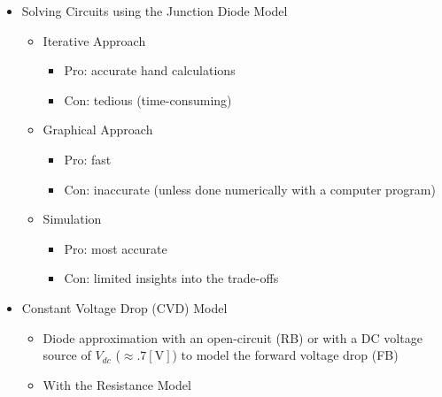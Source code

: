 \begin{itemize}
  \item Solving Circuits using the Junction Diode Model

    \begin{itemize}

      \item Iterative Approach

        \begin{itemize}

          \item Pro: accurate hand calculations

          \item Con: tedious (time-consuming)

        \end{itemize}

      \item Graphical Approach

        \begin{itemize}

          \item Pro: fast

          \item Con: inaccurate (unless done numerically with a computer program)

        \end{itemize}

      \item Simulation

        \begin{itemize}

          \item Pro: most accurate

          \item Con: limited insights into the trade-offs

        \end{itemize}

    \end{itemize}

  \item Constant Voltage Drop (CVD) Model

    \begin{itemize}

      \item Diode approximation with an open-circuit (RB) or with a DC voltage source of $V_{dc}$ ($\approx .7[\si{\volt}]$) to model the forward voltage drop (FB)

      \item With the Resistance Model


\end{itemize}
\end{itemize}

